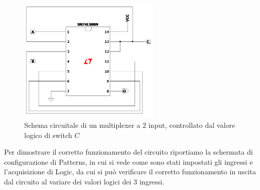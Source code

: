 \documentclass[10pt, a4paper, italian]{article}
\begin{document}
\begin{figure}[htbp]
    \centering
    \includegraphics[width=0.6\textwidth]{NAND_MP.png}
    \caption{Schema circuitale di un multiplexer a 2 input, controllato dal
    valore logico di switch $C$}
    \label{fig: mult_circ}
\end{figure}

Per dimostrare il corretto funzionamento del circuito riportiamo la schermata
di configurazione di Patterns, in cui si vede come sono stati impostati gli
ingressi e l'acquisizione di Logic, da cui si può verificare il corretto
funzionamento in uscita dal circuito al variare dei valori logici dei 3
ingressi.
\end{document}
